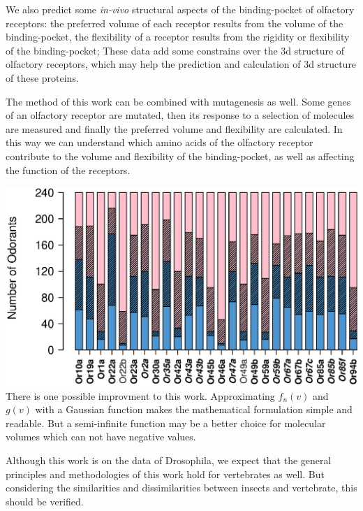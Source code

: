 \documentclass[landscape,a1paper,fontscale=0.6]{baposter} %
\begin{document}
\begin{poster}
{We also predict some {\it in-vivo} structural aspects of  the binding-pocket of olfactory receptors:
the preferred volume of each receptor results from the volume of the binding-pocket,
the flexibility of a receptor results from the rigidity or flexibility of the binding-pocket; 
These data add some constrains over the 3d structure of olfactory receptors, 
which may help the prediction and calculation of 3d structure of these proteins. 

The method of this work can be combined with mutagenesis as well. 
Some genes of an olfactory receptor are mutated, 
then its response to a selection of molecules are measured and finally the preferred volume and flexibility are calculated.
In this way we can understand which amino acids of the olfactory receptor contribute to the volume and flexibility of the binding-pocket, 
as well as affecting the function of the receptors.

\centering
		\includegraphics[width=0.2 \textwidth]{fig/odorant-suggest}
There is one possible improvment to this work. Approximating $f_n(v)$ and $g(v)$ with a Gaussian function makes the mathematical formulation simple and readable. 
But a semi-infinite function may be a better choice for molecular volumes which can not have negative values.

Although this work is on the data of Drosophila, 
we expect that the general principles and methodologies of this work hold for vertebrates as well. 
But considering the similarities and dissimilarities between insects and vertebrate, 
this should be verified.

}




\end{poster}
\end{document}
